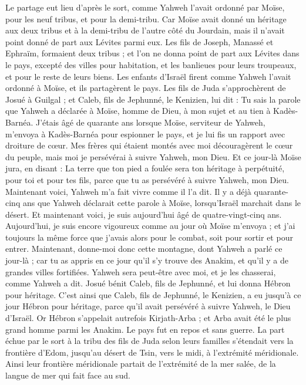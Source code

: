 \begin{multicols}{2}
Le partage eut lieu d’après le sort, comme Yahweh l’avait ordonné par Moïse, pour les neuf tribus, et pour la demi-tribu.
Car Moïse avait donné un héritage aux deux tribus et à la demi-tribu de l’autre côté du Jourdain, mais il n’avait point donné de part aux Lévites parmi eux.
Les fils de Joseph, Manassé et Ephraïm, formaient deux tribus ; et l’on ne donna point de part aux Lévites dans le pays, excepté des villes pour habitation, et les banlieues pour leurs troupeaux, et pour le reste de leurs biens.
Les enfants d’Israël firent comme Yahweh l’avait ordonné à Moïse, et ils partagèrent le pays.
Les fils de Juda s’approchèrent de Josué à Guilgal ; et Caleb, fils de Jephunné, le Kenizien, lui dit : Tu sais la parole que Yahweh a déclarée à Moïse, homme de Dieu, à mon sujet et au tien à Kadès-Barnéa.
J’étais âgé de quarante ans lorsque Moïse, serviteur de Yahweh, m’envoya à Kadès-Barnéa pour espionner le pays, et je lui fis un rapport avec droiture de cœur.
Mes frères qui étaient montés avec moi découragèrent le cœur du peuple, mais moi je persévérai à suivre Yahweh, mon Dieu.
Et ce jour-là Moïse jura, en disant : La terre que ton pied a foulée sera ton héritage à perpétuité, pour toi et pour tes fils, parce que tu as persévéré à suivre Yahweh, mon Dieu.
Maintenant voici, Yahweh m’a fait vivre comme il l’a dit. Il y a déjà quarante-cinq ans que Yahweh déclarait cette parole à Moïse, lorsqu’Israël marchait dans le désert. Et maintenant voici, je suis aujourd’hui âgé de quatre-vingt-cinq ans.
Aujourd’hui, je suis encore vigoureux comme au jour où Moïse m’envoya ; et j’ai toujours la même force que j’avais alors pour le combat, soit pour sortir et pour entrer.
Maintenant, donne-moi donc cette montagne, dont Yahweh a parlé ce jour-là ; car tu as appris en ce jour qu’il s’y trouve des Anakim, et qu’il y a de grandes villes fortifiées. Yahweh sera peut-être avec moi, et je les chasserai, comme Yahweh a dit.
Josué bénit Caleb, fils de Jephunné, et lui donna Hébron pour héritage.
C’est ainsi que Caleb, fils de Jephunné, le Kenizien, a eu jusqu’à ce jour Hébron pour héritage, parce qu’il avait persévéré à suivre Yahweh, le Dieu d’Israël.
Or Hébron s’appelait autrefois Kirjath-Arba ; et Arba avait été le plus grand homme parmi les Anakim. Le pays fut en repos et sans guerre.
\VerseOne{}La part échue par le sort à la tribu des fils de Juda selon leurs familles s’étendait vers la frontière d’Edom, jusqu’au désert de Tsin, vers le midi, à l’extrémité méridionale.
Ainsi leur frontière méridionale partait de l’extrémité de la mer salée, de la langue de mer qui fait face au sud.

\end{multicols}
